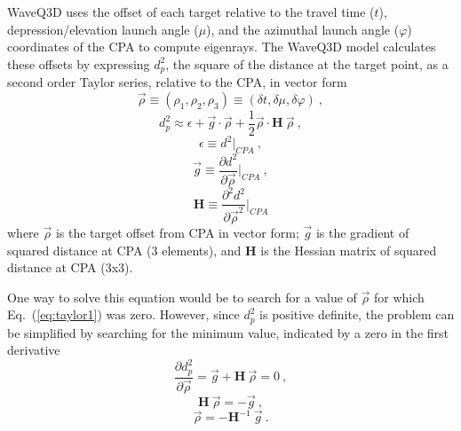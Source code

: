 \documentclass{ws-jca}
\begin{document}
WaveQ3D uses the offset of each target relative to the travel time  (\(t\)),
depression/elevation launch angle (\(\mu\)), and the azimuthal launch
angle (\(\varphi\)) coordinates of the CPA to compute eigenrays.
The WaveQ3D model calculates these offsets by expressing \(d^2_{p}\), the square
of the distance at the target point, as a second
order Taylor series, relative to the CPA, in vector form
\begin{equation}
	\vec{\rho} \equiv (\rho_1, \rho_2, \rho_3) 
		\equiv (\delta t, \delta \mu, \delta \varphi) \:,
	\label{eq:rho_defined}
\end{equation}
\begin{equation}
	d^2_{p} \approx \epsilon + \vec{g} \cdot \vec{\rho} 
		+ \frac{1}{2} \vec{\rho} \cdot \mathbf{H} \: \vec{\rho} \:,
	\label{eq:taylor1}
\end{equation}
\begin{equation}
	\epsilon  \equiv d^2 \big|_{CPA} \:,
	\label{eq:taylor2}
\end{equation}
\begin{equation}
	\vec{g} \equiv \frac{\partial d^2}{\partial \vec{\rho} } \big|_{CPA} \:,
	\label{eq:taylor3}
\end{equation}
\begin{equation}
	\mathbf{H} \equiv \frac{\partial^2 d^2}{\partial \vec{\rho}^2 } \big|_{CPA}
	\label{eq:taylor4}
\end{equation}
where 
\(\vec{\rho}\) is the target offset from CPA in vector form;
\(\vec{g}\) is the gradient of squared distance at CPA (3 elements), and
\(\mathbf{H}\) is the Hessian matrix of squared distance at CPA (3x3).

One way to solve this equation would be to search for a value of
\(\vec{\rho}\) for which Eq.~(\ref{eq:taylor1}) was zero. However, since
\(d^2_{p}\) is positive definite, the problem can be simplified by
searching for the minimum value, indicated by a zero in the first
derivative
\begin{equation}
	\frac{\partial d^2_{p}}{\partial \vec{\rho} } 
		= \vec{g} + \mathbf{H} \: \vec{\rho} = 0 \:,
	\label{eq:inverse1}
\end{equation}
\begin{equation}
	\mathbf{H} \: \vec{\rho} = -\vec{g} \:,
	\label{eq:inverse2}
\end{equation}
\begin{equation}
	\vec{\rho} = - \mathbf{H}^{-1} \: \vec{g} \:.
	\label{eq:inverse3}
\end{equation}
\end{document}
